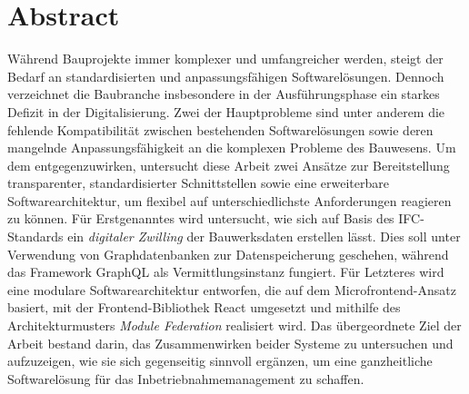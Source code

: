 \section*{Abstract}
Während Bauprojekte immer komplexer und umfangreicher werden, steigt der Bedarf an standardisierten und anpassungsfähigen Softwarelösungen.
Dennoch verzeichnet die Baubranche insbesondere in der Ausführungsphase ein starkes Defizit in der Digitalisierung.
Zwei der Hauptprobleme sind unter anderem die fehlende Kompatibilität zwischen bestehenden Softwarelösungen sowie deren mangelnde Anpassungsfähigkeit
an die komplexen Probleme des Bauwesens. Um dem entgegenzuwirken, untersucht diese Arbeit zwei Ansätze zur Bereitstellung transparenter, standardisierter Schnittstellen
sowie eine erweiterbare Softwarearchitektur, um flexibel auf unterschiedlichste Anforderungen reagieren zu können. Für Erstgenanntes wird untersucht,
wie sich auf Basis des IFC-Standards ein \textit{digitaler Zwilling} der Bauwerksdaten erstellen lässt. Dies soll unter Verwendung von Graphdatenbanken zur Datenspeicherung geschehen, während
das Framework GraphQL als Vermittlungsinstanz fungiert. Für Letzteres wird eine modulare Softwarearchitektur entworfen, die auf dem Microfrontend-Ansatz basiert,
mit der Frontend-Bibliothek React umgesetzt und mithilfe des Architekturmusters \textit{Module Federation} realisiert wird.
Das übergeordnete Ziel der Arbeit bestand darin, das Zusammenwirken beider Systeme zu untersuchen und aufzuzeigen, wie sie sich gegenseitig sinnvoll ergänzen, um eine ganzheitliche Softwarelösung für das Inbetriebnahmemanagement zu schaffen.